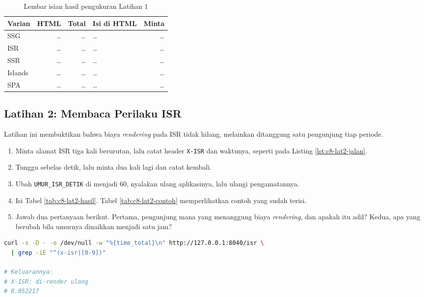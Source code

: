 \begin{table}[!htb]
  \centering
  \caption{Lembar isian hasil pengukuran Latihan 1}
  \label{tab:c8-lat1-hasil}
  \begin{tabularx}{\textwidth}{lrrlr}
    \hline
    \textbf{Varian} & \textbf{HTML} & \textbf{Total} & \textbf{Isi di HTML} & \textbf{Minta} \\
    \hline
    SSG & \dots & \dots & \dots & \dots \\
    \hline
    ISR & \dots & \dots & \dots & \dots \\
    \hline
    SSR & \dots & \dots & \dots & \dots \\
    \hline
    Islands & \dots & \dots & \dots & \dots \\
    \hline
    SPA & \dots & \dots & \dots & \dots \\
    \hline
  \end{tabularx}
\end{table}

\subsection*{Latihan 2: Membaca Perilaku ISR}

Latihan ini membuktikan bahwa biaya \textit{rendering} pada ISR tidak hilang,
melainkan ditanggung satu pengunjung tiap periode.

\begin{enumerate}
  \item Minta alamat ISR tiga kali berurutan, lalu catat header
        \texttt{X-ISR} dan waktunya, seperti pada Listing
        \ref{lst:c8-lat2-jalan}.
  \item Tunggu sebelas detik, lalu minta dua kali lagi dan catat kembali.
  \item Ubah \texttt{UMUR\_ISR\_DETIK} di
         menjadi 60, nyalakan ulang
        aplikasinya, lalu ulangi pengamatannya.
  \item Isi Tabel \ref{tab:c8-lat2-hasil}. Tabel \ref{tab:c8-lat2-contoh}
        memperlihatkan contoh yang sudah terisi.
  \item Jawab dua pertanyaan berikut. Pertama, pengunjung mana yang
        menanggung biaya \textit{rendering}, dan apakah itu adil? Kedua, apa yang
        berubah bila umurnya dinaikkan menjadi satu jam?
\end{enumerate}

\begin{lstlisting}[language=bash, caption={Mengamati daur ISR, tersedia di \berkas{sources/chapter08/aplikasi.py}}, label={lst:c8-lat2-jalan}]
curl -s -D - -o /dev/null -w "%{time_total}\n" http://127.0.0.1:8040/isr \
  | grep -iE "^(x-isr|[0-9])"

# Keluarannya:
# X-ISR: di-render ulang
# 0.052217
\end{lstlisting}

